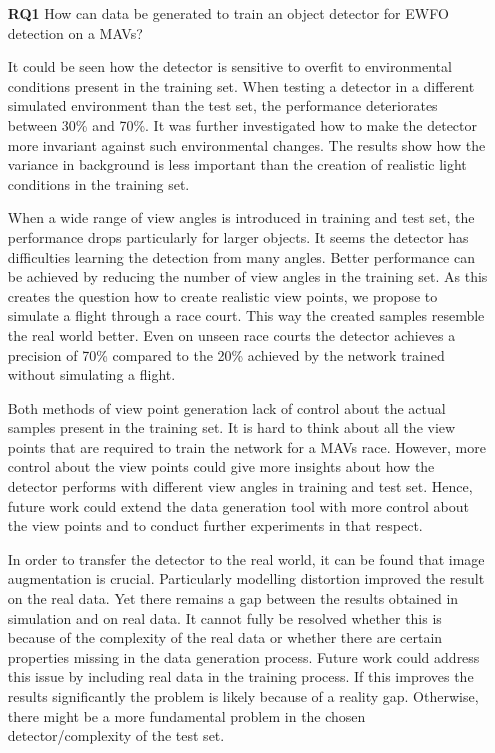 \begin{enumerate}
	\item[\textbf{RQ1}]How can data be generated to train an object detector for \ac{EWFO} detection on a \acp{MAV}?
	
	It could be seen how the detector is sensitive to overfit to environmental conditions present in the training set. When testing a detector in a different simulated environment than the test set, the performance deteriorates between 30\% and 70\%. It was further investigated how to make the detector more invariant against such environmental changes. The results show how the variance in background is less important than the creation of realistic light conditions in the training set.
	
	When a wide range of view angles is introduced in training and test set, the performance drops particularly for larger objects. It seems the detector has difficulties learning the detection from many angles. Better performance can be achieved by reducing the number of view angles in the training set. As this creates the question how to create realistic view points, we propose to simulate a flight through a race court. This way the created samples resemble the real world better. Even on unseen race courts the detector achieves a precision of 70\% compared to the 20\% achieved by the network trained without simulating a flight. 
	
	Both methods of view point generation lack of control about the actual samples present in the training set. It is hard to think about all the view points that are required to train the network for a \acp{MAV} race. However, more control about the view points could give more insights about how the detector performs with different view angles in training and test set. Hence, future work could extend the data generation tool with more control about the view points and to conduct further experiments in that respect.
		
	In order to transfer the detector to the real world, it can be found that image augmentation is crucial. Particularly modelling distortion improved the result on the real data. Yet there remains a gap between the results obtained in simulation and on real data. It cannot fully be resolved whether this is because of the complexity of the real data or whether there are certain properties missing in the data generation process. Future work could address this issue by including real data in the training process. If this improves the results significantly the problem is likely because of a reality gap. Otherwise, there might be a more fundamental problem in the chosen detector/complexity of the test set.
	

\end{enumerate}
